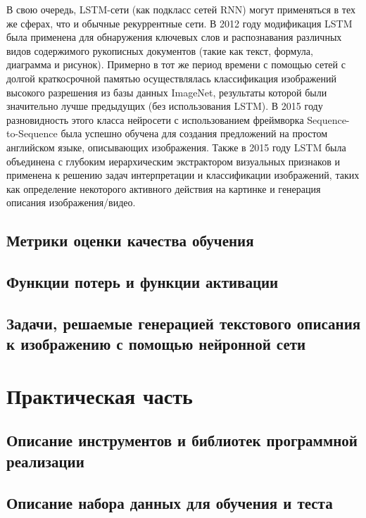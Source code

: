 \documentclass[bachelor, och, coursework]{SCWorks}
\begin{document}
        В свою очередь, LSTM-сети (как подкласс сетей RNN) могут применяться в тех же сферах, что и обычные рекуррентные
        сети. В 2012 году модификация LSTM была применена для обнаружения ключевых слов и распознавания различных видов
        содержимого рукописных документов (такие как текст, формула, диаграмма и рисунок). Примерно в тот же период
        времени с помощью сетей с долгой краткосрочной памятью осуществлялась классификация изображений высокого
        разрешения из базы данных ImageNet, результаты которой были значительно лучше предыдущих (без использования
        LSTM). В 2015 году разновидность этого класса нейросети с использованием фреймворка Sequence-to-Sequence была
        успешно обучена для создания предложений на простом английском языке, описывающих изображения. Также в 2015 году
        LSTM была объединена с глубоким иерархическим экстрактором визуальных признаков и применена к решению задач
        интерпретации и классификации изображений, таких как определение некоторого активного действия на картинке и
        генерация описания изображения/видео.

    \subsection{Метрики оценки качества обучения}
    \subsection{Функции потерь и функции активации}
    \subsection{Задачи, решаемые генерацией текстового описания к изображению с помощью нейронной сети}

\section{Практическая часть}

    \subsection{Описание инструментов и библиотек программной реализации}

    \subsection{Описание набора данных для обучения и теста}
\end{document}
